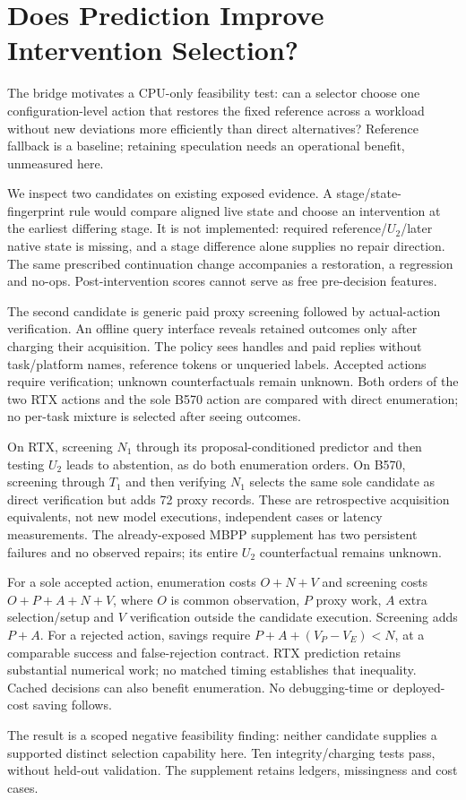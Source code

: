 \section{Does Prediction Improve Intervention Selection?}
\label{sec:selection}
The bridge motivates a CPU-only feasibility test: can a selector choose one configuration-level action that restores the fixed reference across a workload without new deviations more efficiently than direct alternatives? Reference fallback is a baseline; retaining speculation needs an operational benefit, unmeasured here.

We inspect two candidates on existing exposed evidence. A stage/state-fingerprint rule would compare aligned live state and choose an intervention at the earliest differing stage. It is not implemented: required reference/$U_2$/later native state is missing, and a stage difference alone supplies no repair direction. The same prescribed continuation change accompanies a restoration, a regression and no-ops. Post-intervention scores cannot serve as free pre-decision features.

The second candidate is generic paid proxy screening followed by actual-action verification. An offline query interface reveals retained outcomes only after charging their acquisition. The policy sees handles and paid replies without task/platform names, reference tokens or unqueried labels. Accepted actions require verification; unknown counterfactuals remain unknown. Both orders of the two RTX actions and the sole B570 action are compared with direct enumeration; no per-task mixture is selected after seeing outcomes.


On RTX, screening $N_1$ through its proposal-conditioned predictor and then testing $U_2$ leads to abstention, as do both enumeration orders. On B570, screening through $T_1$ and then verifying $N_1$ selects the same sole candidate as direct verification but adds 72 proxy records. These are retrospective acquisition equivalents, not new model executions, independent cases or latency measurements. The already-exposed MBPP supplement has two persistent failures and no observed repairs; its entire $U_2$ counterfactual remains unknown.

For a sole accepted action, enumeration costs $O+N+V$ and screening costs $O+P+A+N+V$, where $O$ is common observation, $P$ proxy work, $A$ extra selection/setup and $V$ verification outside the candidate execution. Screening adds $P+A$. For a rejected action, savings require $P+A+(V_P-V_E)<N$, at a comparable success and false-rejection contract. RTX prediction retains substantial numerical work; no matched timing establishes that inequality. Cached decisions can also benefit enumeration. No debugging-time or deployed-cost saving follows.

The result is a scoped negative feasibility finding: neither candidate supplies a supported distinct selection capability here. Ten integrity/charging tests pass, without held-out validation. The supplement retains ledgers, missingness and cost cases.
